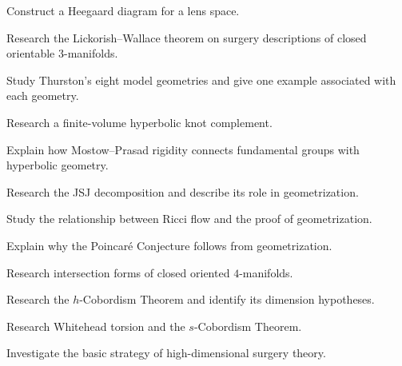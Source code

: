 \begin{exercise}[4]
Construct a Heegaard diagram for a lens space.
\end{exercise}

\begin{exercise}[4]
Research the Lickorish--Wallace theorem on surgery descriptions of closed
orientable \(3\)-manifolds.
\end{exercise}

\begin{exercise}[4]
Study Thurston's eight model geometries and give one example associated with
each geometry.
\end{exercise}

\begin{exercise}[4]
Research a finite-volume hyperbolic knot complement.
\end{exercise}

\begin{exercise}[4]
Explain how Mostow--Prasad rigidity connects fundamental groups with
hyperbolic geometry.
\end{exercise}

\begin{exercise}[4]
Research the JSJ decomposition and describe its role in geometrization.
\end{exercise}

\begin{exercise}[4]
Study the relationship between Ricci flow and the proof of geometrization.
\end{exercise}

\begin{exercise}[4]
Explain why the Poincar\'e Conjecture follows from geometrization.
\end{exercise}

\begin{exercise}[4]
Research intersection forms of closed oriented \(4\)-manifolds.
\end{exercise}

\begin{exercise}[4]
Research the \(h\)-Cobordism Theorem and identify its dimension hypotheses.
\end{exercise}

\begin{exercise}[4]
Research Whitehead torsion and the \(s\)-Cobordism Theorem.
\end{exercise}

\begin{exercise}[4]
Investigate the basic strategy of high-dimensional surgery theory.
\end{exercise}

